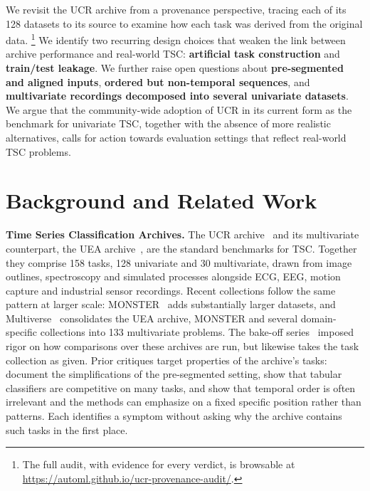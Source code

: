 \documentclass{article}
\newcommand{\browserurl}{\url{https://automl.github.io/ucr-provenance-audit/}}
\begin{document}
We revisit the UCR archive from a provenance perspective, tracing each of its 128 datasets to its source to examine how each task was derived from the original data.
\footnote{The full audit, with evidence for every verdict, is browsable at \browserurl.}
We identify two recurring design choices that weaken the link between archive performance and real-world TSC: \textbf{artificial task construction} and \textbf{train/test leakage}. We further raise open questions about \textbf{pre-segmented and aligned inputs}, \textbf{ordered but non-temporal sequences}, and \textbf{multivariate recordings decomposed into several univariate datasets}.
We argue that the community-wide adoption of UCR in its current form as the benchmark for univariate TSC, together with the absence of more realistic alternatives, calls for action towards evaluation settings that reflect real-world TSC problems.


\section{Background and Related Work}
\textbf{Time Series Classification Archives.}
The UCR archive~\citep{dau2019ucr} and its multivariate counterpart, the UEA archive~\citep{bagnall2018uea}, are the standard benchmarks for TSC. Together they comprise 158 tasks, 128 univariate and 30 multivariate, drawn from image outlines, spectroscopy and simulated processes alongside ECG, EEG, motion capture and industrial sensor recordings. Recent collections follow the same pattern at larger scale: MONSTER~\citep{dempster2025monster} adds substantially larger datasets, and Multiverse~\citep{middlehurst2026multiverse} consolidates the UEA archive, MONSTER and several domain-specific collections into 133 multivariate problems. The bake-off series~\citep{bagnall2016bakeoff,middlehurst2024redux} imposed rigor on how comparisons over these archives are run, but likewise takes the task collection as given. Prior critiques target properties of the archive's tasks: \citet{hu2016streaming} document the simplifications of the pre-segmented setting, \citet{dhariyal2023backtobasics} show that tabular classifiers are competitive on many tasks, and \citet{zhang2025revisit} show that temporal order is often irrelevant and the methods can emphasize on a fixed specific position rather than patterns. Each identifies a symptom without asking why the archive contains such tasks in the first place.
\end{document}
